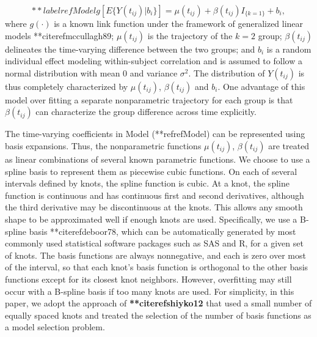 \begin{equation}**labelref{Model}
g[E\{Y(t_{ij})|b_{i}\}]=\mu(t_{ij})+\beta(t_{ij})I_{\{k=1\}}+b_i,
\end{equation}
where $g(\cdot)$ is a known link function under the framework of
generalized linear models **citeref{mccullagh89}; $\mu(t_{ij})$ is the
trajectory of the $k=2$ group; $\beta(t_{ij})$ delineates the
time-varying difference between the two groups; and $b_i$ is a
random individual effect modeling within-subject correlation and
is assumed to follow a normal distribution with mean 0 and
variance $\sigma^2$. The distribution of $Y(t_{ij})$ is thus
completely characterized by $\mu(t_{ij})$, $\beta(t_{ij})$ and
$b_i$. One advantage of this model over fitting a separate
nonparametric trajectory for each group is that $\beta(t_{ij})$
can characterize the group difference across time explicitly.


The time-varying coefficients in Model (**refref{Model}) can be
represented using basis expansions. Thus, the nonparametric
functions $\mu(t_{ij})$, $\beta(t_{ij})$ are treated as linear
combinations of several known parametric functions. We choose to
use a spline basis to represent them as piecewise cubic functions.
On each of several intervals defined by knots, the spline function
is cubic. At a knot, the spline function is continuous and has
continuous first and second derivatives, although the third
derivative may be discontinuous at the knots. This allows any
smooth shape to be approximated well if enough knots are used.
Specifically, we use a B-spline basis **citeref{deboor78}, which can
be automatically generated by most commonly used statistical
software packages such as SAS and R, for a given set of knots. The
basis functions are always nonnegative, and each is zero over most
of the interval, so that each knot's basis function is orthogonal
to the other basis functions except for its closest knot
neighbors. However, overfitting may still occur with a B-spline
basis if too many knots are used. For simplicity, in this paper,
we adopt the approach of \textbf{**citeref{shiyko12}} that used a
small number of equally spaced knots and treated the selection of
the number of basis functions as a model selection problem.


